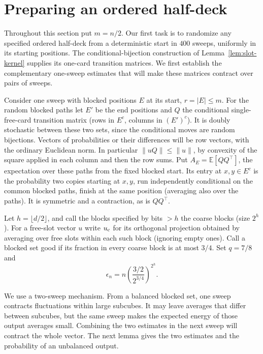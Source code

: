 \section{Preparing an ordered half-deck}\label{sec:preparation}

Throughout this section put $m=n/2$. Our first task is to randomize any specified ordered half-deck from a deterministic start in $400$ sweeps, uniformly in its starting positions. The conditional-bijection construction of Lemma~\ref{lem:slot-kernel} supplies its one-card transition matrices. We first establish the complementary one-sweep estimates that will make these matrices contract over pairs of sweeps.

Consider one sweep with blocked positions \(E\) at its start, \(r=|E|\le m\). For the random blocked paths let \(E'\) be the end positions and \(Q\) the conditional single-free-card transition matrix (rows in \(E^c\), columns in \((E')^c\)). It is doubly stochastic between these two sets, since the conditional moves are random bijections. Vectors of probabilities or their differences will be row vectors, with the ordinary Euclidean norm. In particular \(\|uQ\|\le\|u\|\), by convexity of the square applied in each column and then the row sums. Put \(A_E=\mathbb E[QQ^\top]\), the expectation over these paths from the fixed blocked start. Its entry at \(x,y\in E^c\) is the probability two copies starting at \(x,y\), run independently conditional on the common blocked paths, finish at the same position (averaging also over the paths). It is symmetric and a contraction, as is \(QQ^\top\).

Let \(h=\lfloor d/2\rfloor\), and call the blocks specified by bits \(>h\) the coarse blocks (size \(2^h\)). For a free-slot vector \(u\) write \(u_{\rm c}\) for its orthogonal projection obtained by averaging over free slots within each such block (ignoring empty ones). Call a blocked set good if its fraction in every coarse block is at most \(3/4\). Set \(q=7/8\) and
\[
 \epsilon_n=n\left(\frac{3/2}{2^{3/4}}\right)^{2^h}.
\]

We use a two-sweep mechanism. From a balanced blocked set, one sweep contracts fluctuations within large subcubes. It may leave averages that differ between subcubes, but the same sweep makes the expected energy of those output averages small. Combining the two estimates in the next sweep will contract the whole vector. The next lemma gives the two estimates and the probability of an unbalanced output.

